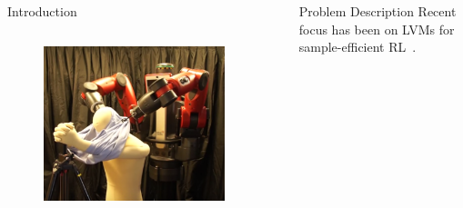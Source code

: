 \documentclass[final,hyperref={pdfpagelabels=false}]{beamer}
\begin{document}
\begin{frame}[t]
\begin{columns}[t]
\begin{column}{0.47\linewidth}
\begin{block}{Introduction}
\begin{columns}[t]
                    \begin{column}{0.4\textwidth}
                        \begin{figure}
                            \centering
                            \includegraphics[width=\textwidth]{setup}
                        \end{figure}
                    \end{column}
                \end{columns}
            \end{block}
        \end{column}

        \begin{column}{0.02\linewidth}\end{column}

        \begin{column}{0.47\linewidth}
            \begin{block}{Problem Description}
                \centering Recent focus has been on LVMs for sample-efficient RL~\cite{lrl1, lrl2}.


\end{block}
\end{column}
\end{columns}
\end{frame}
\end{document}
